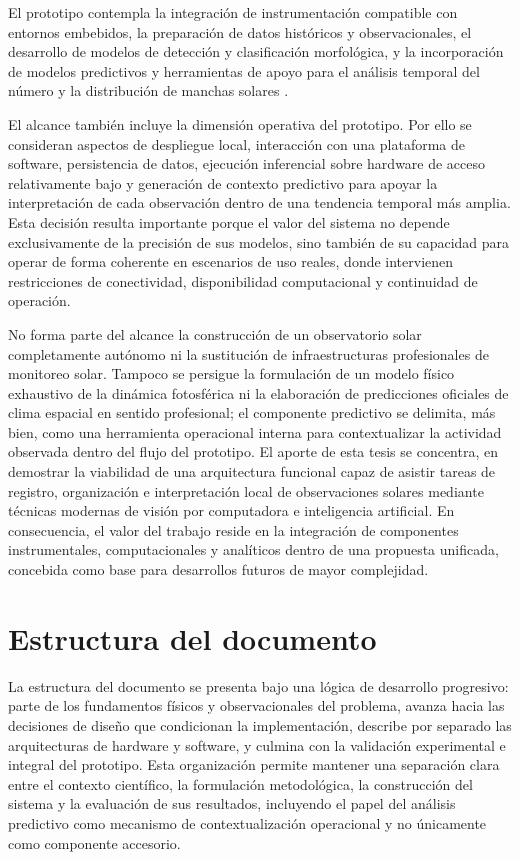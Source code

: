 El prototipo contempla la integración de instrumentación compatible con entornos embebidos, la preparación de datos históricos y observacionales, el desarrollo de modelos de detección y clasificación morfológica, y la incorporación de modelos predictivos y herramientas de apoyo para el análisis temporal del número y la distribución de manchas solares \citep{ultralyticsYOLO26,deng2025mcintosh,pesnell2012predictions}. 

El alcance también incluye la dimensión operativa del prototipo. Por ello se consideran aspectos de despliegue local, interacción con una plataforma de software, persistencia de datos, ejecución inferencial sobre hardware de acceso relativamente bajo y generación de contexto predictivo para apoyar la interpretación de cada observación dentro de una tendencia temporal más amplia. Esta decisión resulta importante porque el valor del sistema no depende exclusivamente de la precisión de sus modelos, sino también de su capacidad para operar de forma coherente en escenarios de uso reales, donde intervienen restricciones de conectividad, disponibilidad computacional y continuidad de operación.

No forma parte del alcance la construcción de un observatorio solar completamente autónomo ni la sustitución de infraestructuras profesionales de monitoreo solar. Tampoco se persigue la formulación de un modelo físico exhaustivo de la dinámica fotosférica ni la elaboración de predicciones oficiales de clima espacial en sentido profesional; el componente predictivo se delimita, más bien, como una herramienta operacional interna para contextualizar la actividad observada dentro del flujo del prototipo. El aporte de esta tesis se concentra, en demostrar la viabilidad de una arquitectura funcional capaz de asistir tareas de registro, organización e interpretación local de observaciones solares mediante técnicas modernas de visión por computadora e inteligencia artificial. En consecuencia, el valor del trabajo reside en la integración de componentes instrumentales, computacionales y analíticos dentro de una propuesta unificada, concebida como base para desarrollos futuros de mayor complejidad.

\section{Estructura del documento}

La estructura del documento se presenta bajo una lógica de desarrollo progresivo: parte de los fundamentos físicos y observacionales del problema, avanza hacia las decisiones de diseño que condicionan la implementación, describe por separado las arquitecturas de hardware y software, y culmina con la validación experimental e integral del prototipo. Esta organización permite mantener una separación clara entre el contexto científico, la formulación metodológica, la construcción del sistema y la evaluación de sus resultados, incluyendo el papel del análisis predictivo como mecanismo de contextualización operacional y no únicamente como componente accesorio.

